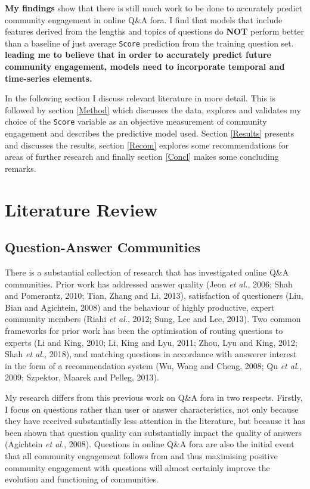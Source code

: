\documentclass[11pt,preprint, authoryear]{article}
\numberwithin{equation}{section}
\begin{document}
\newpage

\textbf{My findings} show that there is still much work to be done to
accurately predict community engagement in online Q\&A fora. I find that
models that include features derived from the lengths and topics of
questions do \textbf{NOT} perform better than a baseline of just average
\texttt{Score} prediction from the training question set.
\textbf{leading me to believe that in order to accurately predict future
community engagement, models need to incorporate temporal and
time-series elements.}

In the following section I discuss relevant literature in more detail.
This is followed by section \ref{Method} which discusses the data,
explores and validates my choice of the \texttt{Score} variable as an
objective measurement of community engagement and describes the
predictive model used. Section \ref{Results} presents and discusses the
results, section \ref{Recom} explores some recommendations for areas of
further research and finally section \ref{Concl} makes some concluding
remarks.

\newpage

\section{\texorpdfstring{Literature Review
\label{Lit}}{Literature Review }}\label{literature-review}

\subsection{Question-Answer
Communities}\label{question-answer-communities}

There is a substantial collection of research that has investigated
online Q\&A communities. Prior work has addressed answer quality (Jeon
\emph{et al.}, 2006; Shah and Pomerantz, 2010; Tian, Zhang and Li,
2013), satisfaction of questioners (Liu, Bian and Agichtein, 2008) and
the behaviour of highly productive, expert community members (Riahi
\emph{et al.}, 2012; Sung, Lee and Lee, 2013). Two common frameworks for
prior work has been the optimisation of routing questions to experts (Li
and King, 2010; Li, King and Lyu, 2011; Zhou, Lyu and King, 2012; Shah
\emph{et al.}, 2018), and matching questions in accordance with answerer
interest in the form of a recommendation system (Wu, Wang and Cheng,
2008; Qu \emph{et al.}, 2009; Szpektor, Maarek and Pelleg, 2013).

My research differs from this previous work on Q\&A fora in two
respects. Firstly, I focus on questions rather than user or answer
characteristics, not only because they have received substantially less
attention in the literature, but because it has been shown that question
quality can substantially impact the quality of answers (Agichtein
\emph{et al.}, 2008). Questions in online Q\&A fora are also the initial
event that all community engagement follows from and thus maximising
positive community engagement with questions will almost certainly
improve the evolution and functioning of communities.
\end{document}
